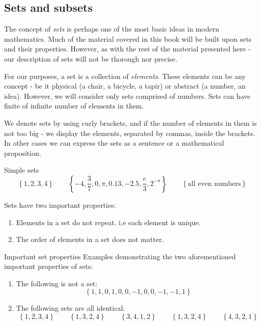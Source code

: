\subsection{Sets and subsets}
The concept of \emph{sets} is perhaps one of the most basic ideas in modern mathematics. Much of the material covered in this book will be built upon sets and their properties. However, as with the rest of the material presented here - our description of sets will not be thorough nor precise.

For our purposes, a set is a collection of \emph{elements}. These elements can be any concept - be it physical (a chair, a bicycle, a tapir) or abstract (a number, an idea). However, we will consider only sets comprised of numbers. Sets can have finite of infinite number of elements in them.

We denote sets by using curly brackets, and if the number of elements in them is not too big - we display the elements, separated by commas, inside the brackets. In other cases we can express the sets as a sentence or a mathematical proposition.

\begin{example}{Simple sets}{}
	\[
		\left\{ 1,2,3,4 \right\}\qquad\left\{ -4,\frac{3}{7},0,\pi,0.13,-2.5,\frac{e}{3},2^{-\pi} \right\}\qquad\left\{ \text{all even numbers} \right\}
	\]
\end{example}

Sets have two important properties:
\begin{enumerate}
	\item Elements in a set do not repeat. i.e each element is unique. 
	\item The order of elements in a set does not matter.
\end{enumerate}

\begin{example}{Important set properties}{}
	Examples demonstrating the two aforementioned important properties of sets:
	\begin{enumerate}
		\item The following is not a set:
		\[
			\left\{ 1,1,0,1,0,0,-1,0,0,-1,-1,1 \right\}
	\]

		\item The following sets are all identical:
		\[
			\left\{ 1,2,3,4 \right\}\qquad\left\{ 1,3,2,4  \right\}\qquad\left\{ 3,4,1,2 \right\}\qquad\left\{ 1,3,2,4 \right\}\qquad\left\{ 4,3,2,1 \right\}
		\]
	\end{enumerate}
	
\end{example}

